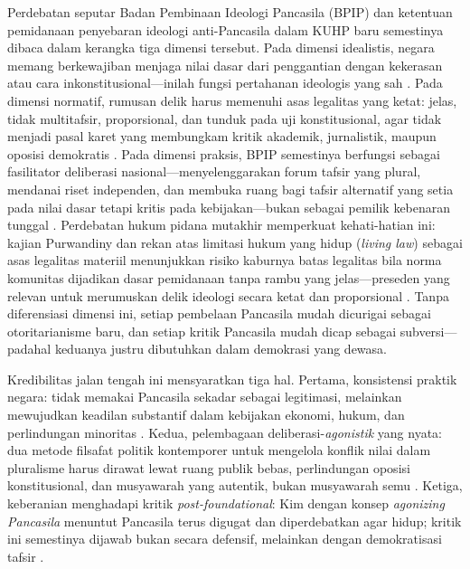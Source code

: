 \documentclass[journal]{IEEEtran}
\begin{document}
Perdebatan seputar Badan Pembinaan Ideologi Pancasila (BPIP) dan ketentuan pemidanaan penyebaran ideologi anti-Pancasila dalam KUHP baru semestinya dibaca dalam kerangka tiga dimensi tersebut. Pada dimensi idealistis, negara memang berkewajiban menjaga nilai dasar dari penggantian dengan kekerasan atau cara inkonstitusional---inilah fungsi pertahanan ideologis yang sah \cite{bpip2022,uud1945}. Pada dimensi normatif, rumusan delik harus memenuhi asas legalitas yang ketat: jelas, tidak multitafsir, proporsional, dan tunduk pada uji konstitusional, agar tidak menjadi pasal karet yang membungkam kritik akademik, jurnalistik, maupun oposisi demokratis \cite{assiddiqie2006,kim2024}. Pada dimensi praksis, BPIP semestinya berfungsi sebagai fasilitator deliberasi nasional---menyelenggarakan forum tafsir yang plural, mendanai riset independen, dan membuka ruang bagi tafsir alternatif yang setia pada nilai dasar tetapi kritis pada kebijakan---bukan sebagai pemilik kebenaran tunggal \cite{suntana2023,kim2024}. Perdebatan hukum pidana mutakhir memperkuat kehati-hatian ini: kajian Purwandiny dan rekan atas limitasi hukum yang hidup (\textit{living law}) sebagai asas legalitas materiil menunjukkan risiko kaburnya batas legalitas bila norma komunitas dijadikan dasar pemidanaan tanpa rambu yang jelas---preseden yang relevan untuk merumuskan delik ideologi secara ketat dan proporsional \cite{purwandiny2025}. Tanpa diferensiasi dimensi ini, setiap pembelaan Pancasila mudah dicurigai sebagai otoritarianisme baru, dan setiap kritik Pancasila mudah dicap sebagai subversi---padahal keduanya justru dibutuhkan dalam demokrasi yang dewasa.

Kredibilitas jalan tengah ini mensyaratkan tiga hal. Pertama, konsistensi praktik negara: tidak memakai Pancasila sekadar sebagai legitimasi, melainkan mewujudkan keadilan substantif dalam kebijakan ekonomi, hukum, dan perlindungan minoritas \cite{suntana2023,kim2024}. Kedua, pelembagaan deliberasi-\textit{agonistik} yang nyata: dua metode filsafat politik kontemporer untuk mengelola konflik nilai dalam pluralisme harus dirawat lewat ruang publik bebas, perlindungan oposisi konstitusional, dan musyawarah yang autentik, bukan musyawarah semu \cite{madung2016,habermas1996,mouffe2005}. Ketiga, keberanian menghadapi kritik \textit{post-foundational}: Kim dengan konsep \textit{agonizing Pancasila} menuntut Pancasila terus digugat dan diperdebatkan agar hidup; kritik ini semestinya dijawab bukan secara defensif, melainkan dengan demokratisasi tafsir \cite{kim2024}.
\end{document}
